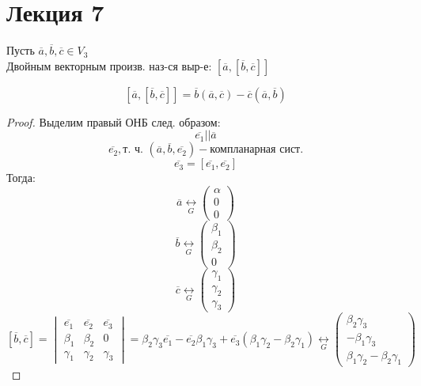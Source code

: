 \section{Лекция 7}
\begin{definition}
Пусть $\overline{a}, \overline{b}, \overline{c} \in V_3$ \\
Двойным векторным произв. наз-ся выр-е: $[\overline{a}, [\overline{b}, \overline{c}]]$
\end{definition}
\begin{theorem}
\[
[\overline{a}, [\overline{b}, \overline{c}]] = \overline{b}(\overline{a}, \overline{c}) - \overline{c}(\overline{a}, \overline{b})
\]
\end{theorem}
\begin{proof}
Выделим правый ОНБ след. образом:
\[
  \overline{e_1} || \overline{a}
\]
\[
\overline{e_2}, \text{т. ч. } (\overline{a}, \overline{b}, \overline{e_2}) - \text{компланарная сист.}
\]
\[
\overline{e_3} = [\overline{e_1}, \overline{e_2}]
\]
Тогда:
\[
\overline{a} \underset{G}{\longleftrightarrow} \begin{pmatrix}\alpha \\ 0 \\ 0 \end{pmatrix}
\]
\[
\overline{b} \underset{G}{\longleftrightarrow} \begin{pmatrix} \beta_1 \\ \beta_2 \\ 0 \end{pmatrix}
\]
\[
\overline{c} \underset{G}{\longleftrightarrow} \begin{pmatrix}\gamma_1 \\ \gamma_2 \\ \gamma_3 \end{pmatrix}
\]
\[
  [\overline{b}, \overline{c}] = \begin{vmatrix} \overline{e_1} & \overline{e_2} & \overline{e_3} \\ \beta_1 & \beta_2 & 0 \\ \gamma_1 & \gamma_2 & \gamma_3\end{vmatrix} =  \beta_2\gamma_3\overline{e_1} - \overline{e_2} \beta_1\gamma_3 + \overline{e_3}(\beta_1\gamma_2 - \beta_2\gamma_1) \underset{G}{\longleftrightarrow} \begin{pmatrix}\beta_2\gamma_3 \\ -\beta_1\gamma_3 \\ \beta_1\gamma_2 - \beta_2\gamma_1 \end{pmatrix}
\]
\[
\]
\end{proof}
